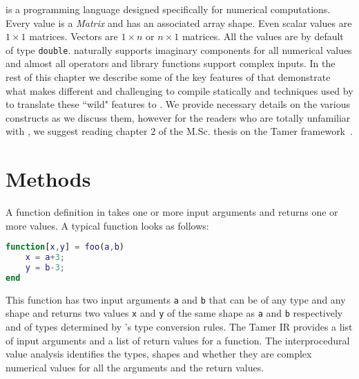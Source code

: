 \matlab is a programming language designed specifically for numerical
computations. Every value is a \emph{Matrix} and has an associated array
shape.  Even scalar values are $1\times1$ matrices. Vectors are
$1\times n$ or $n \times 1$ matrices. All the values are by default of
type \verb+double+.  \matlab naturally supports imaginary components for
all numerical values and almost all operators and library functions
support complex inputs. In the rest of this chapter we describe some of
the key features of \matlab that demonstrate what makes \matlab 
different and challenging to compile statically and techniques used by
\mixten to translate these ``wild" features to \xten. We provide necessary
details on the various \matlab constructs as we discuss them, however for the
readers who are totally unfamiliar with \matlab, we suggest reading chapter 2 of
the M.Sc. thesis on the Tamer framework~\cite{adubra12}. 

\section{Methods}

A function definition in \matlab takes one or more input arguments and
returns one or more values. A typical \matlab function looks as follows:

\begin{lstlisting}[language=Matlab,numbers=none]
function[x,y] = foo(a,b)
    x = a+3;
    y = b-3;
end
\end{lstlisting}

This function has two input arguments \verb|a| and \verb|b| that
can be of any type and any shape and returns two values \verb|x| and
\verb|y| of the same shape as \verb|a| and \verb|b| respectively and of
types determined by \matlab's type conversion rules. The Tamer IR
provides a list of input arguments and a list of return values for a
function. The interprocedural value analysis identifies the types,
shapes and whether they are complex numerical values for all the
arguments and the return values.

